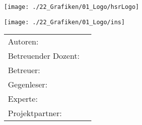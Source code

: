 
\begin{titlepage}
\begin{center}
\begin{minipage}[t]{0.45\textwidth}
    \texttt{[image: ./22\_Grafiken/01\_Logo/hsrLogo]}
\end{minipage}
\hspace{\fill} %
\begin{minipage}[t]{0.45\textwidth}
    \vspace{-2.9cm}
    \texttt{[image: ./22\_Grafiken/01\_Logo/ins]} %
\end{minipage}

\end{center}

\vspace{15ex} %
\begin{center}
	\Huge 
	\begin{framed}
		\textbf{\titel}
	\end{framed}
	
	\vspace{3ex}
	\textbf{\arbeit}
	
	\vspace{1ex}
	\LARGE 
	\place
	
	\vspace{5ex}
	\begin{framed}
		\timeperiod
	\end{framed}
\end{center}

\vspace{11ex}
\begin{tabular}{ll} %
	Autoren:         		& \authors	\\
	Betreuender Dozent:		& \advisorprof  	\\
	Betreuer:        		& \advisor    	\\
	Gegenleser:      		& \contraprof  	\\
	Experte:      			& \expert  		\\
	Projektpartner:      	& \ins  		\\
\end{tabular}

\end{titlepage}

\restoregeometry %
